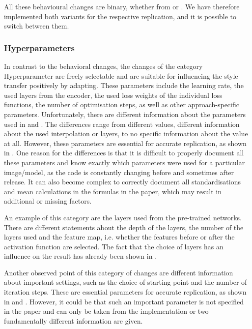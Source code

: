 All these behavioural changes are binary, whether from \paper{} or \implementation{}. We have therefore implemented both variants for the respective replication, and it is possible to switch between them.

\subsubsection{Hyperparameters}
In contrast to the behavioral changes, the changes of the category Hyperparameter are freely selectable and are suitable for influencing the style transfer positively by adapting. These parameters include the learning rate, the used layers from the encoder, the used loss weights of the individual loss functions, the number of optimisation steps, as well as other approach-specific parameters. Unfortunately, there are different information about the parameters used in \paper{} and \implementation{}. The differences range from different values, different information about the used interpolation or layers, to no specific information about the value at all. However, these parameters are essential for accurate replication, as shown in . One reason for the differences is that it is difficult to properly document all these parameters and know exactly which parameters were used for a particular image/model, as the code is constantly changing before and sometimes after release. It can also become complex to correctly document all standardisations and mean calculations in the formulas in the paper, which may result in additional or missing factors. 

An example of this category are the layers used from the pre-trained networks. There are different statements about the depth of the layers, the number of the layers used and the feature map, i.e. whether the features before or after the activation function are selected. The fact that the choice of layers has an influence on the result has already been shown in . 

Another observed point of this category of changes are different information about important settings, such as the choice of starting point and the number of iteration steps. These are essential parameters for accurate replication, as shown in  and . However, it could be that such an important parameter is not specified in the paper and can only be taken from the implementation or two fundamentally different information are given.  

